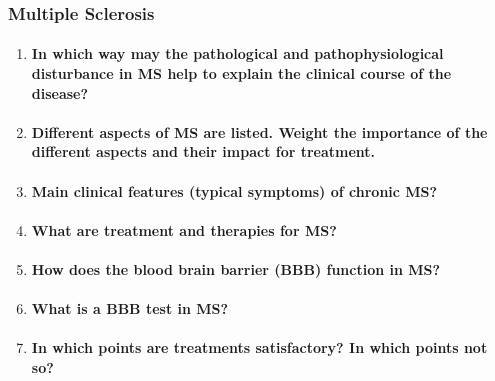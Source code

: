 \documentclass[12pt,article,oneside,a4paper]{memoir}
\begin{document}
\subsubsection{Multiple Sclerosis}
\begin{enumerate}
\item \paragraph{In which way may the pathological and pathophysiological disturbance in MS help to explain the clinical course of the disease?}

\item \paragraph{Different aspects of MS are listed. Weight the importance of the different aspects and their impact for treatment.}\label{question:MS-aspects}

\item \paragraph{Main clinical features (typical symptoms) of chronic MS?}\label{question:MS-symptoms}

\item \paragraph{What are treatment and therapies for MS?}

\item \paragraph{How does the blood brain barrier (BBB) function in MS?}

\item \paragraph{What is a BBB test in MS?}

\item \paragraph{In which points are treatments satisfactory?  In which points not so?}


\end{enumerate}
\end{document}
